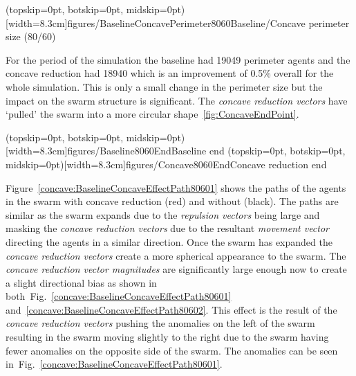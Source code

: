 \documentclass{ieeeaccess}
\begin{document}
\Figure[t!](topskip=0pt, botskip=0pt, midskip=0pt)[width=8.3cm]{figures/BaselineConcavePerimeter8060}{Baseline/Concave perimeter size (80/60)\label{concave:BaselineConcavePerimeter8060}}

For the period of the simulation the baseline had 19049 perimeter agents and the concave reduction had 18940 which is an improvement of 0.5\% overall for the whole simulation. This is only a small change in the perimeter size but the impact on the swarm structure is significant. The \textit{concave reduction vectors} have `pulled' the swarm into a more circular shape~\ref{fig:ConcaveEndPoint}.

\Figure[t!](topskip=0pt, botskip=0pt, midskip=0pt)[width=8.3cm]{figures/Baseline8060End}{Baseline end\label{fig:BaselineEndPoint}}
\Figure[t!](topskip=0pt, botskip=0pt, midskip=0pt)[width=8.3cm]{figures/Concave8060End}{Concave reduction end\label{fig:ConcaveEndPoint}}

Figure~\ref{concave:BaselineConcaveEffectPath80601} shows the paths of the agents in the swarm with concave reduction (red) and without (black). The paths are similar as the swarm expands due to the \textit{repulsion vectors} being large and masking the \textit{concave reduction vectors} due to the resultant \textit{movement vector} directing the agents in a similar direction. Once the swarm has expanded the \textit{concave reduction vectors} create a more spherical appearance to the swarm. The \textit{concave reduction vector magnitudes} are significantly large enough now to create a slight directional bias as shown in both~Fig.~\ref{concave:BaselineConcaveEffectPath80601} and~\ref{concave:BaselineConcaveEffectPath80602}. This effect is the result of the \textit{concave reduction vectors} pushing the anomalies on the left of the swarm resulting in the swarm moving slightly to the right due to the swarm having fewer anomalies on the opposite side of the swarm. The anomalies can be seen in~Fig.~\ref{concave:BaselineConcaveEffectPath80601}.
\end{document}
